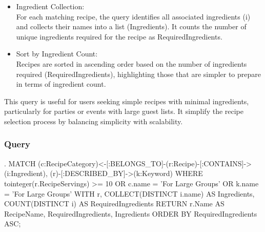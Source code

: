 \begin{enumerate}
\begin{itemize}
    \item Ingredient Collection:\\
    For each matching recipe, the query identifies all associated ingredients (i) and collects their names into a list (Ingredients). It counts the number of unique ingredients required for the recipe as RequiredIngredients.
    \item Sort by Ingredient Count:\\
    Recipes are sorted in ascending order based on the number of ingredients required (RequiredIngredients), highlighting those that are simpler to prepare in terms of ingredient count.
\end{itemize}
This query is useful for users seeking simple recipes with minimal ingredients, particularly for parties or events with large guest lists. It simplify the recipe selection process by balancing simplicity with scalability.
        \subsubsection{Query}
\begin{CypherQuery}
.
MATCH 
(c:RecipeCategory)<-[:BELONGS_TO]-(r:Recipe)-[:CONTAINS]->(i:Ingredient),
(r)-[:DESCRIBED_BY]->(k:Keyword)
WHERE tointeger(r.RecipeServings) >= 10 
OR c.name = 'For Large Groups' 
OR k.name = 'For Large Groups'
WITH r, COLLECT(DISTINCT i.name) AS Ingredients,
COUNT(DISTINCT i) AS RequiredIngredients
RETURN r.Name AS RecipeName, RequiredIngredients, Ingredients
ORDER BY RequiredIngredients ASC;
\end{CypherQuery}

\end{enumerate}
